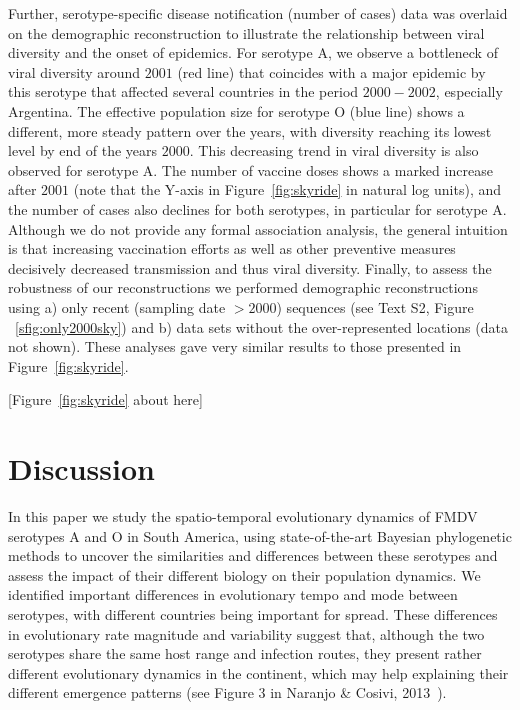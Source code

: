 \documentclass[10pt]{article}
\begin{document}
Further, serotype-specific disease notification (number of cases) data was overlaid on the demographic reconstruction to illustrate the relationship between viral diversity and the onset of epidemics. 
For serotype A, we observe a bottleneck of viral diversity around $2001$ (red line) that coincides with a major epidemic by this serotype that affected several countries in the period $2000-2002$, especially Argentina.
The effective population size for serotype O (blue line) shows a different, more steady pattern over the years, with diversity reaching its lowest level by end of the years $2000$.
This decreasing trend in viral diversity is also observed for serotype A.
The number of vaccine doses shows a marked increase after $2001$ (note that the Y-axis in Figure~\ref{fig:skyride} in natural log units), and the number of cases also declines for both serotypes, in particular for serotype A.
Although we do not provide any formal association analysis, the general intuition is that increasing vaccination efforts as well as other preventive measures decisively decreased transmission and thus viral diversity.
Finally, to assess the robustness of our reconstructions we performed demographic reconstructions using a) only recent (sampling date $>2000$) sequences (see Text S2, Figure ~\ref{sfig:only2000sky}) and b) data sets without the over-represented locations (data not shown).
These analyses gave very similar results to those presented in Figure~\ref{fig:skyride}.

\begin{center}
 [Figure~\ref{fig:skyride} about here]
\end{center}


\section*{Discussion}

In this paper we study the spatio-temporal evolutionary dynamics of FMDV serotypes A and O in South America, using state-of-the-art Bayesian phylogenetic methods to uncover the similarities and differences between these serotypes and assess the impact of their different biology on their population dynamics.
We identified important differences in evolutionary tempo and mode between serotypes, with different countries being important for spread.
These differences in evolutionary rate magnitude and variability suggest that, although the two serotypes share the same host range and infection routes, they present rather different evolutionary dynamics in the continent, which may help explaining their different emergence patterns (see Figure 3 in Naranjo \& Cosivi, 2013~\cite{Naranjo2013}). 
\end{document}
